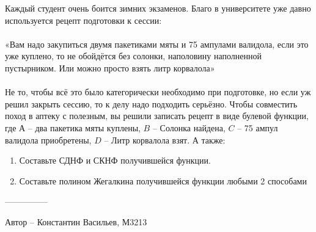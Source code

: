 \question
Каждый студент очень боится зимних экзаменов. Благо в университете уже давно используется рецепт подготовки к сессии:
\\
\\
«Вам надо закупиться двумя пакетиками мяты и 75 ампулами валидола, если это уже куплено, то не обойдётся без солонки, наполовину наполненной пустырником. Или можно просто взять литр корвалола»
\\
\\
Не то, чтобы всё это было категорически необходимо при подготовке, но если уж решил закрыть сессию, то к делу надо подходить серьёзно. Чтобы совместить поход в аптеку с полезным, вы решили записать рецепт в виде булевой функции, где $А$ – два пакетика мяты куплены, $B$ – Солонка найдена, $C$ – 75 ампул валидола приобретены, $D$ – Литр корвалола взят. А также:
\begin{enumerate}
    \item Составьте СДНФ и СКНФ получившейся функции.
    \item Составьте полином Жегалкина получившейся функции любыми 2 способами
\end{enumerate}

---------------

Автор -- Константин Васильев, М3213